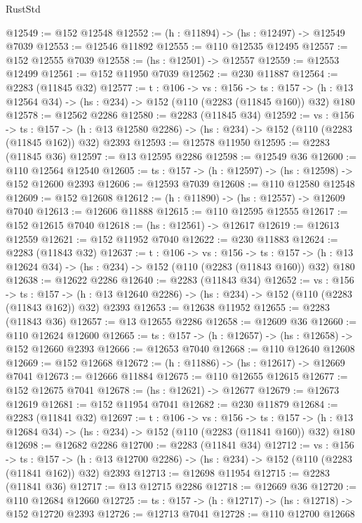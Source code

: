 \begin{lexlean}{RustStd}
\begin{coremodule}
@12549 := @152 @12548
@12552 := (h : @11894) -> (hs : @12497) -> @12549 @7039
@12553 := @12546 @11892
@12555 := @110 @12535 @12495
@12557 := @152 @12555 @7039
@12558 := (hs : @12501) -> @12557
@12559 := @12553 @12499
@12561 := @152 @11950 @7039
@12562 := @230 @11887
@12564 := @2283 (@11845 @32)
@12577 := {t : @106} ->
  {vs : @156} ->
  {ts : @157} -> (h : @13 @12564 @34) -> (hs : @234) -> @152 (@110 (@2283 (@11845 @160)) @32) @180
@12578 := @12562 @2286
@12580 := @2283 (@11845 @34)
@12592 := {vs : @156} ->
  {ts : @157} ->
  (h : @13 @12580 @2286) -> (hs : @234) -> @152 (@110 (@2283 (@11845 @162)) @32) @2393
@12593 := @12578 @11950
@12595 := @2283 (@11845 @36)
@12597 := @13 @12595 @2286
@12598 := @12549 @36
@12600 := @110 @12564 @12540
@12605 := {ts : @157} -> (h : @12597) -> (hs : @12598) -> @152 @12600 @2393
@12606 := @12593 @7039
@12608 := @110 @12580 @12548
@12609 := @152 @12608
@12612 := (h : @11890) -> (hs : @12557) -> @12609 @7040
@12613 := @12606 @11888
@12615 := @110 @12595 @12555
@12617 := @152 @12615 @7040
@12618 := (hs : @12561) -> @12617
@12619 := @12613 @12559
@12621 := @152 @11952 @7040
@12622 := @230 @11883
@12624 := @2283 (@11843 @32)
@12637 := {t : @106} ->
  {vs : @156} ->
  {ts : @157} -> (h : @13 @12624 @34) -> (hs : @234) -> @152 (@110 (@2283 (@11843 @160)) @32) @180
@12638 := @12622 @2286
@12640 := @2283 (@11843 @34)
@12652 := {vs : @156} ->
  {ts : @157} ->
  (h : @13 @12640 @2286) -> (hs : @234) -> @152 (@110 (@2283 (@11843 @162)) @32) @2393
@12653 := @12638 @11952
@12655 := @2283 (@11843 @36)
@12657 := @13 @12655 @2286
@12658 := @12609 @36
@12660 := @110 @12624 @12600
@12665 := {ts : @157} -> (h : @12657) -> (hs : @12658) -> @152 @12660 @2393
@12666 := @12653 @7040
@12668 := @110 @12640 @12608
@12669 := @152 @12668
@12672 := (h : @11886) -> (hs : @12617) -> @12669 @7041
@12673 := @12666 @11884
@12675 := @110 @12655 @12615
@12677 := @152 @12675 @7041
@12678 := (hs : @12621) -> @12677
@12679 := @12673 @12619
@12681 := @152 @11954 @7041
@12682 := @230 @11879
@12684 := @2283 (@11841 @32)
@12697 := {t : @106} ->
  {vs : @156} ->
  {ts : @157} -> (h : @13 @12684 @34) -> (hs : @234) -> @152 (@110 (@2283 (@11841 @160)) @32) @180
@12698 := @12682 @2286
@12700 := @2283 (@11841 @34)
@12712 := {vs : @156} ->
  {ts : @157} ->
  (h : @13 @12700 @2286) -> (hs : @234) -> @152 (@110 (@2283 (@11841 @162)) @32) @2393
@12713 := @12698 @11954
@12715 := @2283 (@11841 @36)
@12717 := @13 @12715 @2286
@12718 := @12669 @36
@12720 := @110 @12684 @12660
@12725 := {ts : @157} -> (h : @12717) -> (hs : @12718) -> @152 @12720 @2393
@12726 := @12713 @7041
@12728 := @110 @12700 @12668

\end{coremodule}
\end{lexlean}
